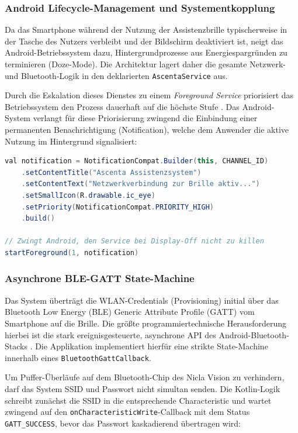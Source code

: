 \subsubsection*{Android Lifecycle-Management und Systementkopplung}
Da das Smartphone während der Nutzung der Assistenzbrille typischerweise in der Tasche des Nutzers verbleibt und der Bildschirm deaktiviert ist, neigt das Android-Betriebssystem dazu, Hintergrundprozesse aus Energiespargründen zu terminieren (Doze-Mode). Die Architektur lagert daher die gesamte Netzwerk- und Bluetooth-Logik in den deklarierten \texttt{AscentaService} aus. 

Durch die Eskalation dieses Dienstes zu einem \textit{Foreground Service} priorisiert das Betriebssystem den Prozess dauerhaft auf die höchste Stufe \cite{android_foreground}. Das Android-System verlangt für diese Priorisierung zwingend die Einbindung einer permanenten Benachrichtigung (Notification), welche dem Anwender die aktive Nutzung im Hintergrund signalisiert:

\begin{lstlisting}[language=Java, caption={Start des Foreground Services zur Verhinderung der Terminierung}]
val notification = NotificationCompat.Builder(this, CHANNEL_ID)
    .setContentTitle("Ascenta Assistenzsystem")
    .setContentText("Netzwerkverbindung zur Brille aktiv...")
    .setSmallIcon(R.drawable.ic_eye)
    .setPriority(NotificationCompat.PRIORITY_HIGH)
    .build()

// Zwingt Android, den Service bei Display-Off nicht zu killen
startForeground(1, notification)
\end{lstlisting}

\subsubsection*{Asynchrone BLE-GATT State-Machine}
Das System überträgt die WLAN-Credentials (Provisioning) initial über das Bluetooth Low Energy (BLE) Generic Attribute Profile (GATT) vom Smartphone auf die Brille. Die größte programmiertechnische Herausforderung hierbei ist die stark ereignisgesteuerte, asynchrone API des Android-Bluetooth-Stacks \cite{android_gatt}. Die Applikation implementiert hierfür eine strikte State-Machine innerhalb eines \texttt{BluetoothGattCallback}.

Um Puffer-Überläufe auf dem Bluetooth-Chip des Nicla Vision zu verhindern, darf das System SSID und Passwort nicht simultan senden. Die Kotlin-Logik schreibt zunächst die SSID in die entsprechende Characteristic und wartet zwingend auf den \texttt{onCharacteristicWrite}-Callback mit dem Status \texttt{GATT\_SUCCESS}, bevor das Passwort kaskadierend übertragen wird:

